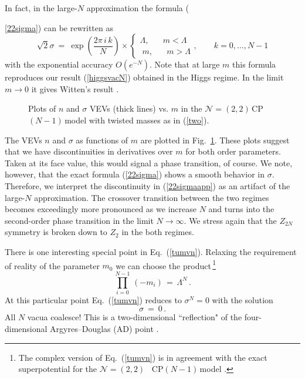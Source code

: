 \documentclass[epsfig,12pt]{article}
\def\beq{\begin{equation}}
\def\eeq{\end{equation}}
\newcommand{\ntt}{${\mathcal N}=(2,2)\,$}
\newcommand{\cpn}{CP$(N-1)\,$}
\def\beq{\begin{equation}}
\def\eeq{\end{equation}}
\newcommand{\ntwot}{${\mathcal N}= \left(2,2\right) $ }
\begin{document}
In fact, in the large-$N$ approximation the formula ({\ref{22sigma}) can be rewritten as
\beq
\sqrt{2}\sigma ~=~ \exp\left( \frac{2\pi\,i\, k}{N}
\right)\times \left\{
\begin{array}{cc}
\Lambda,\;\;\;\;\;\;m <\Lambda\\[1mm]
\;m,\;\;\;\;\;\; m > \Lambda
\end{array},
\right.
 \qquad k=0, ..., N-1
\label{22sigmaapp}
\eeq
with the exponential accuracy   $O\left(e^{-N}\right)$. Note that at large $m$ this formula reproduces our
result (\ref{higgsvacN}) obtained in the Higgs regime. In the limit $m\to 0$ it gives Witten's
result  \cite{W79}.

\begin{figure}
\epsfxsize=7cm
\centerline{}
\caption{\small Plots of $n$ and $\sigma$ VEVs (thick lines) vs. $m$
in the \ntt \cpn model with twisted masses as in (\ref{two}). }
\label{fig22nsigma}
\end{figure}

The  VEVs $n$ and $\sigma$ as functions of $m$ are plotted in Fig.~\ref{fig22nsigma}.
These plots suggest that we have  discontinuities in derivatives over $m$ for both order
parameters. Taken at its face value, this would signal a phase transition, of course. We note, however, that 
the exact formula
(\ref{22sigma}) shows a smooth behavior in $\sigma$. Therefore, we interpret the discontinuity in
(\ref{22sigmaapp}) as an artifact of the large-$N$ approximation. The crossover transition between 
the two regimes becomes exceedingly more pronounced as we increase 
$N$ and turns into the second-order phase transition in the
limit $N\to\infty$. We stress again that the $Z_{2N}$ symmetry is broken down to $Z_2$ in 
the both regimes.

There is one interesting special point in Eq.~(\ref{tumvn}).
Relaxing the requirement of reality of the parameter $m_0$ we can choose the 
product\,\footnote{The complex version of Eq.~(\ref{tumvn}) is in agreement
with the exact superpotential for the \mbox{\ntwot} \cpn model
\cite{AdDVecSal,ChVa,W93,HaHo,Dor}.}
\beq
\prod_{i=0}^{N-1}\,(-m_i) \,=\,\Lambda^N\,.
\label{ADpoint}
\eeq
At this particular point 
 Eq.~(\ref{tumvn}) reduces to $\sigma^N =0$ with the solution
\beq
\sigma ~=~ 0\,.
\label{ADsigma}
\eeq
All $N$ vacua coalesce!  
This is a two-dimensional ``reflection" of the four-dimensional
Argyres--Douglas (AD) point \cite{AD,APSW}.


}
\end{document}
